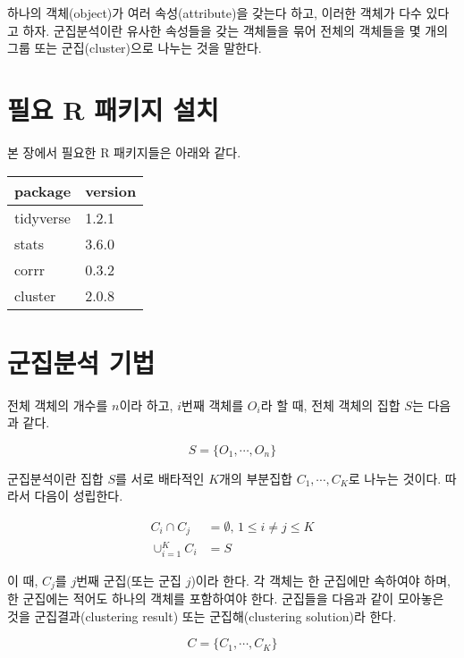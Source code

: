 \documentclass[]{book}
\begin{document}
하나의 객체(object)가 여러 속성(attribute)을 갖는다 하고, 이러한 객체가 다수 있다고 하자. 군집분석이란 유사한 속성들을 갖는 객체들을 묶어 전체의 객체들을 몇 개의 그룹 또는 군집(cluster)으로 나누는 것을 말한다.

\hypertarget{clustering-overview-packages-install}{%
\section{필요 R 패키지 설치}\label{clustering-overview-packages-install}}

본 장에서 필요한 R 패키지들은 아래와 같다.

\begin{tabular}{l|l}
\hline
package & version\\
\hline
tidyverse & 1.2.1\\
\hline
stats & 3.6.0\\
\hline
corrr & 0.3.2\\
\hline
cluster & 2.0.8\\
\hline
\end{tabular}

\hypertarget{clustering-method}{%
\section{군집분석 기법}\label{clustering-method}}

전체 객체의 개수를 \(n\)이라 하고, \(i\)번째 객체를 \(O_i\)라 할 때, 전체 객체의 집합 \(S\)는 다음과 같다.

\begin{equation*}
S = \{O_1, \cdots, O_n\}
\end{equation*}

군집분석이란 집합 \(S\)를 서로 배타적인 \(K\)개의 부분집합 \(C_1, \cdots, C_K\)로 나누는 것이다. 따라서 다음이 성립한다.

\begin{equation*}
\begin{split}
C_i \cap C_j &= \emptyset, \, 1 \leq i \neq j \leq K\\
\cup_{i = 1}^{K} C_i &= S
\end{split}
\end{equation*}

이 때, \(C_j\)를 \(j\)번째 군집(또는 군집 \(j\))이라 한다. 각 객체는 한 군집에만 속하여야 하며, 한 군집에는 적어도 하나의 객체를 포함하여야 한다. 군집들을 다음과 같이 모아놓은 것을 군집결과(clustering result) 또는 군집해(clustering solution)라 한다.

\begin{equation*}
C = \{C_1, \cdots, C_K\}
\end{equation*}
\end{document}
